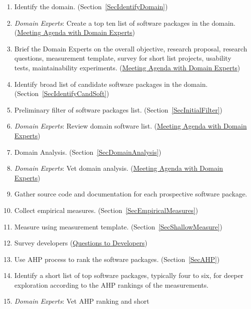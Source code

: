 \documentclass[letterpaper,cleveref]{lipics-v2019}
\theoremstyle{definition}
\begin{document}
\begin{enumerate}
\item Identify the domain. (Section~\ref{SecIdentifyDomain})
\item \emph{Domain Experts}: Create a top ten list of software packages in the
  domain. (\href{https://github.com/smiths/AIMSS/blob/master/StateOfPractice/Methodology/Meeting
    Agenda withmDomainmExperts.pdf}{Meeting Agenda with Domain Experts})
\item Brief the Domain Experts on the overall objective, research proposal,
  research questions, measurement template, survey for short list projects,
  usability tests, maintainability
  experiments. (\href{https://github.com/smiths/AIMSS/blob/master/StateOfPractice/Methodology/Meeting
    Agenda withmDomainmExperts.pdf}{Meeting Agenda with Domain Experts})
\item Identify broad list of candidate software packages in the
  domain. (Section~\ref{SecIdentifyCandSoft})
\item Preliminary filter of software packages
  list. (Section~\ref{SecInitialFilter})
\item \emph{Domain Experts}: Review domain software
  list. (\href{https://github.com/smiths/AIMSS/blob/master/StateOfPractice/Methodology/Meeting
    Agenda withmDomainmExperts.pdf}{Meeting Agenda with Domain Experts})
\item Domain Analysis. (Section~\ref{SecDomainAnalysis})
\item \emph{Domain Experts}: Vet domain
  analysis. (\href{https://github.com/smiths/AIMSS/blob/master/StateOfPractice/Methodology/Meeting
    Agenda withmDomainmExperts.pdf}{Meeting Agenda with Domain Experts})
\item Gather source code and documentation for each prospective software
  package.
\item Collect empirical measures. (Section~\ref{SecEmpiricalMeasures})
\item Measure using measurement template. (Section~\ref{SecShallowMeasure})
\item Survey developers
(\href{https://github.com/smiths/AIMSS/blob/master/StateOfPractice/Methodology/Questions
	to Developers.pdf}{Questions to Developers})
\item Use AHP process to rank the software packages. (Section~\ref{SecAHP})
\item Identify a short list of top software packages, typically four to six, for
  deeper exploration according to the AHP rankings of the measurements.
\item \emph{Domain Experts}: Vet AHP ranking and short

\end{enumerate}
\end{document}
